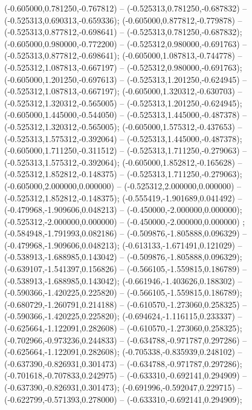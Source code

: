  (-0.605000,0.781250,-0.767812) -- (-0.525313,0.781250,-0.687832) -- (-0.525313,0.690313,-0.659336);
 (-0.605000,0.877812,-0.779878) -- (-0.525313,0.877812,-0.698641) -- (-0.525313,0.781250,-0.687832);
 (-0.605000,0.980000,-0.772200) -- (-0.525312,0.980000,-0.691763) -- (-0.525313,0.877812,-0.698641);
 (-0.605000,1.087813,-0.744778) -- (-0.525312,1.087813,-0.667197) -- (-0.525312,0.980000,-0.691763);
 (-0.605000,1.201250,-0.697613) -- (-0.525313,1.201250,-0.624945) -- (-0.525312,1.087813,-0.667197);
 (-0.605000,1.320312,-0.630703) -- (-0.525312,1.320312,-0.565005) -- (-0.525313,1.201250,-0.624945);
 (-0.605000,1.445000,-0.544050) -- (-0.525313,1.445000,-0.487378) -- (-0.525312,1.320312,-0.565005);
 (-0.605000,1.575312,-0.437653) -- (-0.525313,1.575312,-0.392064) -- (-0.525313,1.445000,-0.487378);
 (-0.605000,1.711250,-0.311512) -- (-0.525313,1.711250,-0.279063) -- (-0.525313,1.575312,-0.392064);
 (-0.605000,1.852812,-0.165628) -- (-0.525312,1.852812,-0.148375) -- (-0.525313,1.711250,-0.279063);
 (-0.605000,2.000000,0.000000) -- (-0.525312,2.000000,0.000000) -- (-0.525312,1.852812,-0.148375);
 (-0.555419,-1.901689,0.041492) -- (-0.479968,-1.909606,0.048213) -- (-0.450000,-2.000000,0.000000);
 (-0.525312,-2.000000,0.000000) -- (-0.450000,-2.000000,0.000000) ;
 (-0.584948,-1.791993,0.082186) -- (-0.509876,-1.805888,0.096329) -- (-0.479968,-1.909606,0.048213);
 (-0.613133,-1.671491,0.121029) -- (-0.538913,-1.688985,0.143042) -- (-0.509876,-1.805888,0.096329);
 (-0.639107,-1.541397,0.156826) -- (-0.566105,-1.559815,0.186789) -- (-0.538913,-1.688985,0.143042);
 (-0.661946,-1.403626,0.188302) -- (-0.590366,-1.420225,0.225820) -- (-0.566105,-1.559815,0.186789);
 (-0.680729,-1.260791,0.214188) -- (-0.610570,-1.273060,0.258325) -- (-0.590366,-1.420225,0.225820);
 (-0.694624,-1.116115,0.233337) -- (-0.625664,-1.122091,0.282608) -- (-0.610570,-1.273060,0.258325);
 (-0.702966,-0.973236,0.244833) -- (-0.634788,-0.971787,0.297286) -- (-0.625664,-1.122091,0.282608);
 (-0.705338,-0.835939,0.248102) -- (-0.637390,-0.826931,0.301473) -- (-0.634788,-0.971787,0.297286);
 (-0.701618,-0.707833,0.242975) -- (-0.633310,-0.692141,0.294909) -- (-0.637390,-0.826931,0.301473);
 (-0.691996,-0.592047,0.229715) -- (-0.622799,-0.571393,0.278000) -- (-0.633310,-0.692141,0.294909);
